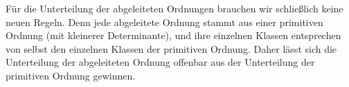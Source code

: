Für die Unterteilung der abgeleiteten Ordnungen brauchen wir schließlich keine neuen Regeln. Denn jede abgeleitete Ordnung stammt aus einer primitiven Ordnung (mit kleinerer Determinante), und ihre einzelnen Klassen entsprechen von selbst den einzelnen Klassen der primitiven Ordnung. Daher lässt sich die Unterteilung der abgeleiteten Ordnung offenbar aus der Unterteilung der primitiven Ordnung gewinnen.

